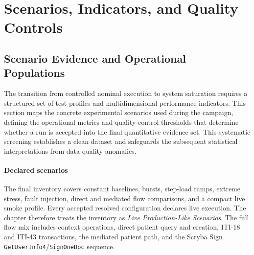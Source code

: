 \section{Scenarios, Indicators, and Quality Controls}
\label{sec:rdg-scenarios-kpis-quality}

\subsection{Scenario Evidence and Operational Populations}
\label{subsec:rdg-scenarios-populations}
\noindent The transition from controlled nominal execution to system saturation
requires a structured set of test profiles and multidimensional performance
indicators. This section maps the concrete experimental scenarios used during
the campaign, defining the operational metrics and quality-control thresholds
that determine whether a run is accepted into the final quantitative evidence
set. This systematic screening establishes a clean dataset and safeguards the
subsequent statistical interpretations from data-quality anomalies.

\paragraph{Declared scenarios}
\noindent The final inventory covers constant baselines, bursts, step-load ramps,
extreme stress, fault injection, direct and mediated flow comparisons, and a
compact live smoke profile. Every accepted resolved configuration declares
live execution. The chapter therefore treats the inventory as \emph{Live
Production-Like Scenarios}. The full flow mix includes context operations,
direct patient query and creation, ITI-18 and ITI-43 transactions, the mediated patient path, and the Scryba Sign
\texttt{GetUserInfo4}/\texttt{SignOneDoc} sequence.

